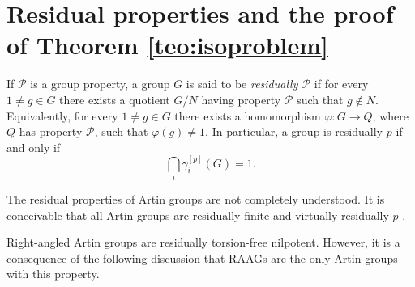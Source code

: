 \documentclass[10pt, oneside]{amsart}
\newcommand{\Z}{\mathbb{Z}} %
\newcommand{\gr}{\operatorname{gr}} %
\theoremstyle{definition}
\theoremstyle{remark}
\theoremstyle{plain}
\begin{document}

\section{Residual properties and the proof of Theorem \ref{teo:isoproblem}}\label{sec:res}
If $\mathcal{P}$ is a group property, a group $G$ is said to be \emph{residually $\mathcal{P}$} if for every $1\neq g\in G$ there exists a quotient $G/N$ having property $\mathcal{P}$ such that $g\notin N$. Equivalently, for every $1\neq g\in G$ there exists a homomorphism $\varphi:G\to Q$, where $Q$ has property $\mathcal{P}$, such that $\varphi(g)\neq 1$. In particular, a group is residually-$p$ if and only if
$$\bigcap_i \gamma_i^{[p]}(G)=1.$$

The residual properties of Artin groups are not completely understood. It is conceivable that all Artin groups are residually finite \cite{BlascoParis2, Jankiewicz, Meier} and virtually residually-$p$ \cite{JS}.

Right-angled Artin groups are residually torsion-free nilpotent. However, it is a consequence of the following discussion that RAAGs are the only Artin groups with this property.
\end{document}
